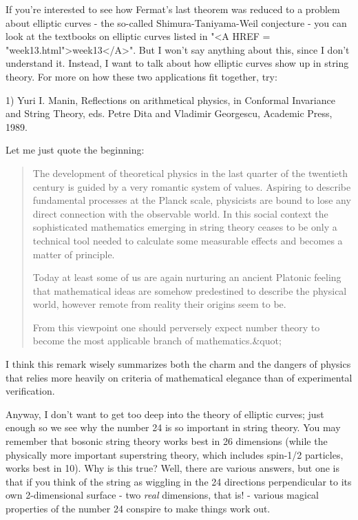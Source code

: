 If you're interested to see how Fermat's last theorem was reduced to a
problem about elliptic curves - the so-called Shimura-Taniyama-Weil 
conjecture - you can look at the textbooks on elliptic curves listed 
in "<A HREF = "week13.html">week13</A>".  
But I won't say anything about this, since I don't understand it.  
Instead, I want to talk about how elliptic curves show up in string
theory.  For more on how these two applications fit together, try:

1) Yuri I. Manin, Reflections on arithmetical physics, in Conformal
Invariance and String Theory, eds. Petre Dita and Vladimir Georgescu,
Academic Press, 1989.

Let me just quote the beginning:

\begin{quote}
     The development of theoretical physics in the last quarter of the
     twentieth century is guided by a very romantic system of values. 
     Aspiring to describe fundamental processes at the Planck scale,
     physicists are bound to lose any direct connection with the
     observable world.  In this social context the sophisticated
     mathematics emerging in string theory ceases to be only a technical
     tool needed to calculate some measurable effects and becomes a
     matter of principle.

     Today at least some of us are again nurturing an ancient Platonic
     feeling that mathematical ideas are somehow predestined to describe
     the physical world, however remote from reality their origins seem
     to be.

     From this viewpoint one should perversely expect number theory to
     become the most applicable branch of mathematics.&quot;

\end{quote}
    
I think this remark wisely summarizes both the charm and the dangers
of physics that relies more heavily on criteria of mathematical
elegance than of experimental verification.

Anyway, I don't want to get too deep into the theory of elliptic curves;
just enough so we see why the number 24 is so important in string
theory.   You may remember that bosonic string theory works best in 26
dimensions (while the physically more important superstring theory,
which includes spin-1/2 particles, works best in 10).  Why is this true?
Well, there are various answers, but one is that if you think of the
string as wiggling in the 24 directions perpendicular to its own
2-dimensional surface - two \emph{real} dimensions, that is! - various
magical properties of the number 24 conspire to make things work out.

